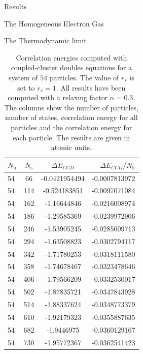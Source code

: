 \documentclass[twoside,english]{uiofysmaster}
\begin{document}
\begin{chapter}{Results}
\begin{section}{The Homogeneous Electron Gas}
\begin{subsection}{The Thermodynamic limit}
			\begin{table}[H]
				\begin{center}
					\begin{tabular}[center]{l  c  c r}
						$N_{\text{h}}$ & $N_{\text{s}}$ & $\Delta E_{CCD}$ & $\Delta E_{CCD}/N_{\text{h}}$ \\
						\hline
						54 &  66 & -0.0421954494 &-0.0007813972\\
						54 &  114 & -0.524183851 &-0.0097071084  \\
						54 &  162 & -1.16644846  &-0.0216008974 \\
						54 & 186 & -1.29585369   &-0.0239972906 \\
						54 & 246 & -1.53905245   &-0.0285009713 \\
						54 & 294 & -1.63508823   &-0.0302794117 \\
						54 & 342 & -1.71780253   &-0.0318111580 \\
						54 & 358 & -1.74678467   &-0.0323478646 \\
						54 & 406 & -1.79566209   &-0.0332530017 \\
						54 & 502 & -1.87835721   &-0.0347843928 \\
						54 & 514 & -1.88337624   &-0.0348773379 \\
						54 & 610 & -1.92179323   &-0.0355887635 \\
						54 & 682 & -1.9446975    &-0.0360129167 \\
						54 & 730 & -1.95772367   &-0.0362541423 
					\end{tabular}
				\end{center}
				\caption{Correlation energies computed with coupled-cluster doubles equations for a system of $54$ particles. The value of $r_s$ is set to $r_s=1$. All results have been computed with a relaxing factor $\alpha=0.3$. The columns show the number of particles, number of states, correlation energy for all particles and the correlation energy for each particle. The results are given in atomic units.}
				\label{table:ThermodynamicLimit3}
			\end{table}


\end{subsection}
\end{section}
\end{chapter}
\end{document}
